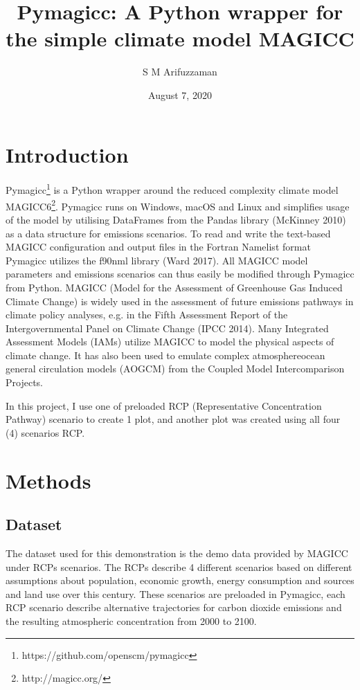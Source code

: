 \documentclass[12pt, letterpaper]{article}
\title{Pymagicc: A Python wrapper for the simple climate
model MAGICC}
\author{S M Arifuzzaman}
\date{August 7, 2020}
\begin{document}
\maketitle

\section{Introduction}
Pymagicc\footnote{https://github.com/openscm/pymagicc} is a Python wrapper around the reduced complexity climate model MAGICC6\footnote{http://magicc.org/}.  
Pymagicc runs on Windows, macOS and Linux and simplifies usage of the model by
utilising DataFrames from the Pandas library (McKinney 2010) as a data structure for
emissions scenarios. To read and write the text-based MAGICC configuration and output
files in the Fortran Namelist format Pymagicc utilizes the f90nml library (Ward 2017). All MAGICC model parameters and emissions scenarios can thus easily be modified through
Pymagicc from Python. MAGICC (Model for the Assessment of Greenhouse Gas Induced Climate Change) is widely used in the assessment of future emissions pathways in climate policy analyses, e.g. in the Fifth Assessment Report of the Intergovernmental Panel on Climate Change (IPCC 2014). Many Integrated Assessment Models (IAMs) utilize MAGICC to model the
physical aspects of climate change. It has also been used to emulate complex atmosphereocean general circulation models (AOGCM) from the Coupled Model Intercomparison
Projects.

In this project, I use one of preloaded RCP (Representative Concentration Pathway) scenario to create 1 plot, and another plot was created using all four (4) scenarios RCP. 
 


\section{Methods}

\subsection{Dataset}
The dataset used for this demonstration is the demo data provided by MAGICC under RCPs scenarios. The RCPs describe 4 different scenarios based on different assumptions about population, economic growth, energy consumption and sources and land use over this century. These scenarios are preloaded in Pymagicc, each RCP scenario describe alternative trajectories for carbon dioxide emissions and the resulting atmospheric concentration from 2000 to 2100.
\end{document}
